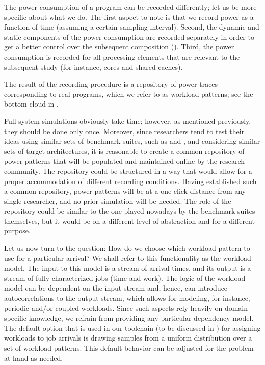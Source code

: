 The power consumption of a program can be recorded differently; let us be more
specific about what we do. The first aspect to note is that we record power as a
function of time (assuming a certain sampling interval). Second, the dynamic and
static components of the power consumption are recorded separately in order to
get a better control over the subsequent composition ().
Third, the power consumption is recorded for all processing elements that are
relevant to the subsequent study (for instance, cores and shared caches).

The result of the recording procedure is a repository of power traces
corresponding to real programs, which we refer to as workload patterns; see the
bottom cloud in .

Full-system simulations obviously take time; however, as mentioned previously,
they should be done only once. Moreover, since researchers tend to test their
ideas using similar sets of benchmark suites, such as 
\cite{bienia2011} and  \cite{cpu2006}, and considering similar
sets of target architectures, it is reasonable to create a common repository of
power patterns that will be populated and maintained online by the research
community. The repository could be structured in a way that would allow for a
proper accommodation of different recording conditions. Having established such
a common repository, power patterns will be at a one-click distance from any
single researcher, and no prior simulation will be needed. The role of the
repository could be similar to the one played nowadays by the benchmark suites
themselves, but it would be on a different level of abstraction and for a
different purpose.

Let us now turn to the question: How do we choose which workload pattern to use
for a particular arrival? We shall refer to this functionality as the workload
model. The input to this model is a stream of arrival times, and its output is a
stream of fully characterized jobs (time and work). The logic of the workload
model can be dependent on the input stream and, hence, can introduce
autocorrelations to the output stream, which allows for modeling, for instance,
periodic and/or coupled workloads. Since such aspects rely heavily on
domain-specific knowledge, we refrain from providing any particular dependency
model. The default option that is used in our toolchain (to be discussed in
) for assigning workloads to job arrivals is drawing samples
from a uniform distribution over a set of workload patterns. This default
behavior can be adjusted for the problem at hand as needed.

